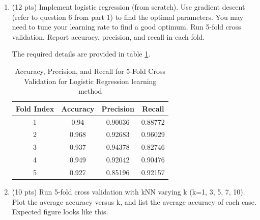 \documentclass[a4paper]{article}
\theoremstyle{definition}
\newenvironment{soln}{
    \leavevmode\color{blue}\ignorespaces
}{}
\begin{document}
\begin{enumerate}
	\item (12 pts) Implement logistic regression (from scratch). Use gradient descent (refer to question 6 from part 1) to find the optimal parameters. You may need to tune your learning rate to find a good optimum. Run 5-fold cross validation. Report accuracy, precision, and recall in each fold.
	
	\begin{soln}
    The required details are provided in table \ref{tab:2}.
    \begin{table}[H]
        \centering
        \begin{tabular}{|c|c|c|c|}
            \hline
            Fold Index & Accuracy & Precision & Recall \\
            \hline
            1 & 0.94 & 0.90036 & 0.88772 \\
            \hline
            2 & 0.968 & 0.92683 & 0.96029 \\
            \hline
            3 & 0.937 & 0.94378 & 0.82746 \\
            \hline
            4 & 0.949 & 0.92042 & 0.90476 \\
            \hline
            5 & 0.927 & 0.85196 & 0.92157 \\
            \hline
        \end{tabular}
        \caption{Accuracy, Precision, and Recall for 5-Fold Cross Validation for Logistic Regression learning method}
        \label{tab:2}
    \end{table}
    \end{soln}
	
	\item (10 pts) Run 5-fold cross validation with kNN varying k (k=1, 3, 5, 7, 10). Plot the average accuracy versus k, and list the average accuracy of each case. \\
	Expected figure looks like this.
	

\end{enumerate}
\end{document}
